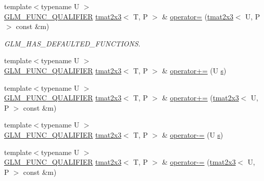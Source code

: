 \begin{DoxyCompactItemize}
\item 
{\footnotesize template$<$typename U $>$ }\\\mbox{\hyperlink{setup_8hpp_a33fdea6f91c5f834105f7415e2a64407}{G\+L\+M\+\_\+\+F\+U\+N\+C\+\_\+\+Q\+U\+A\+L\+I\+F\+I\+ER}} \mbox{\hyperlink{structglm_1_1tmat2x3}{tmat2x3}}$<$ T, P $>$ \& \mbox{\hyperlink{structglm_1_1tmat2x3_a864869c76356750495b6d4172c8d84a3}{operator=}} (\mbox{\hyperlink{structglm_1_1tmat2x3}{tmat2x3}}$<$ U, P $>$ const \&m)
\begin{DoxyCompactList}\small\item\em G\+L\+M\+\_\+\+H\+A\+S\+\_\+\+D\+E\+F\+A\+U\+L\+T\+E\+D\+\_\+\+F\+U\+N\+C\+T\+I\+O\+NS. \end{DoxyCompactList}\item 
{\footnotesize template$<$typename U $>$ }\\\mbox{\hyperlink{setup_8hpp_a33fdea6f91c5f834105f7415e2a64407}{G\+L\+M\+\_\+\+F\+U\+N\+C\+\_\+\+Q\+U\+A\+L\+I\+F\+I\+ER}} \mbox{\hyperlink{structglm_1_1tmat2x3}{tmat2x3}}$<$ T, P $>$ \& \mbox{\hyperlink{structglm_1_1tmat2x3_a59f119877649405d4697179f9f281c0c}{operator+=}} (U \mbox{\hyperlink{glad_8h_af1b1d5edfea6a34daee7389b1b5810ad}{s}})
\item 
{\footnotesize template$<$typename U $>$ }\\\mbox{\hyperlink{setup_8hpp_a33fdea6f91c5f834105f7415e2a64407}{G\+L\+M\+\_\+\+F\+U\+N\+C\+\_\+\+Q\+U\+A\+L\+I\+F\+I\+ER}} \mbox{\hyperlink{structglm_1_1tmat2x3}{tmat2x3}}$<$ T, P $>$ \& \mbox{\hyperlink{structglm_1_1tmat2x3_aeedada1605cb25ac7e5e22b09c85df08}{operator+=}} (\mbox{\hyperlink{structglm_1_1tmat2x3}{tmat2x3}}$<$ U, P $>$ const \&m)
\item 
{\footnotesize template$<$typename U $>$ }\\\mbox{\hyperlink{setup_8hpp_a33fdea6f91c5f834105f7415e2a64407}{G\+L\+M\+\_\+\+F\+U\+N\+C\+\_\+\+Q\+U\+A\+L\+I\+F\+I\+ER}} \mbox{\hyperlink{structglm_1_1tmat2x3}{tmat2x3}}$<$ T, P $>$ \& \mbox{\hyperlink{structglm_1_1tmat2x3_ab20c10a9eacf4c5ba7c68b08d0421b76}{operator-\/=}} (U \mbox{\hyperlink{glad_8h_af1b1d5edfea6a34daee7389b1b5810ad}{s}})
\item 
{\footnotesize template$<$typename U $>$ }\\\mbox{\hyperlink{setup_8hpp_a33fdea6f91c5f834105f7415e2a64407}{G\+L\+M\+\_\+\+F\+U\+N\+C\+\_\+\+Q\+U\+A\+L\+I\+F\+I\+ER}} \mbox{\hyperlink{structglm_1_1tmat2x3}{tmat2x3}}$<$ T, P $>$ \& \mbox{\hyperlink{structglm_1_1tmat2x3_a7c726274f83d7577f62b165eafbb0510}{operator-\/=}} (\mbox{\hyperlink{structglm_1_1tmat2x3}{tmat2x3}}$<$ U, P $>$ const \&m)

\end{DoxyCompactItemize}
